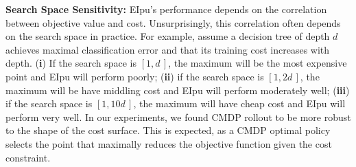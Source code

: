 \textbf{Search Space Sensitivity:}
EIpu's performance depends on the correlation between objective value and cost.
Unsurprisingly, this correlation often depends on the search space in practice.
For example, assume a decision tree of depth $d$ achieves maximal classification error and that its training cost increases with depth.
(\textbf{i}) If the search space is $[1, d\,]$, the maximum will be the most expensive point and EIpu will perform poorly; (\textbf{ii}) if the search space is $[1, 2d\,]$, the maximum will be have middling cost and EIpu will perform moderately well; (\textbf{iii}) if the search space is $[1, 10d\,]$, the maximum will have cheap cost and EIpu will perform very well.
In our experiments, we found CMDP rollout to be more robust to the shape of the cost surface.
This is expected, as a CMDP optimal policy selects the point that maximally reduces the objective function given the cost constraint.
